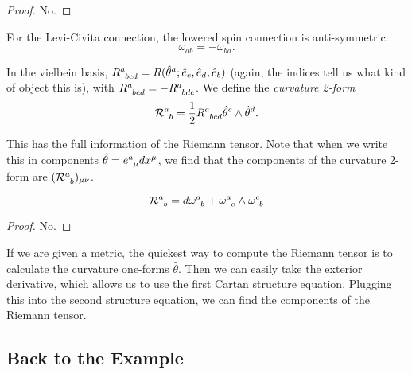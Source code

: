 \begin{proof}
  No.
\end{proof}
\begin{claim}
  For the Levi-Civita connection, the lowered spin connection is anti-symmetric:
  \begin{equation}
    \omega_{ab} = -\omega_{ba}.
  \end{equation}
\end{claim}
\begin{definition}[]
  In the vielbein basis, $R \indices{^a_{bcd}} = R(\hat\theta^a; \hat e_c, \hat e_d, \hat e_b)$ (again, the indices tell us what kind of object this is), with $R \indices{^a_{bcd}} = - R \indices{^a_{bdc}}$.
  We define the \emph{curvature 2-form}
  \begin{equation}
    \mathcal{R} \indices{^a_b} = \frac{1}{2} R \indices{^a_{bcd}} \hat \theta^c \wedge \hat \theta^d.
  \end{equation}
\end{definition}
\begin{leftbar}
  \begin{remark}
    This has the full information of the Riemann tensor. Note that when we write this in components $\hat \theta = e \indices{^a_{\mu}} dx^{\mu}$, we find that the components of the curvature 2-form are $(\mathcal{R} \indices{^a_b})_{\mu\nu}$.
  \end{remark}
\end{leftbar}
\begin{claim}
  \begin{equation}
    \mathcal{R} \indices{^a_b} = d \omega \indices{^a_b} + \omega \indices{^a_c} \wedge \omega \indices{^c_b}
  \end{equation}
\end{claim}
\begin{proof}
  No.
\end{proof}

If we are given a metric, the quickest way to compute the Riemann tensor is to calculate the curvature one-forms $\hat \theta$. Then we can easily take the exterior derivative, which allows us to use the first Cartan structure equation.
Plugging this into the second structure equation, we can find the components of the Riemann tensor.

\subsection*{Back to the Example}%


